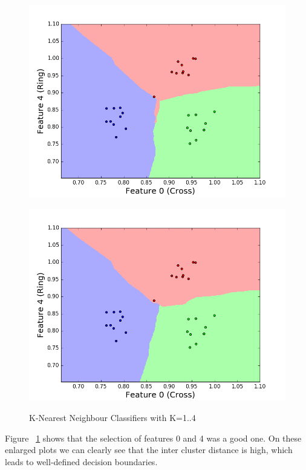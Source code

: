 \documentclass[11pt, a4paper]{article}
\begin{document}
\begin{figure}[!h]
\begin{minipage}[b]{.5\textwidth}
\label{fig:trainb}
\end{minipage}
\begin{minipage}[b]{.5\textwidth}
\centering
\includegraphics[width=1\textwidth]{training_plot_k3.png}
\label{fig:trainc}
\end{minipage}%
\begin{minipage}[b]{.5\textwidth}
\centering
\includegraphics[width=1\textwidth]{training_plot_k4.png}
\label{fig:traind}
\end{minipage}
\caption{K-Nearest Neighbour Classifiers with K=1..4}\label{fig:train}
\end{figure}

Figure ~\ref{fig:train} shows that the selection of features 0 and 4 was a good one. On these enlarged plots we can clearly see that the inter cluster distance is high, which leads to well-defined decision boundaries. 
\end{document}
